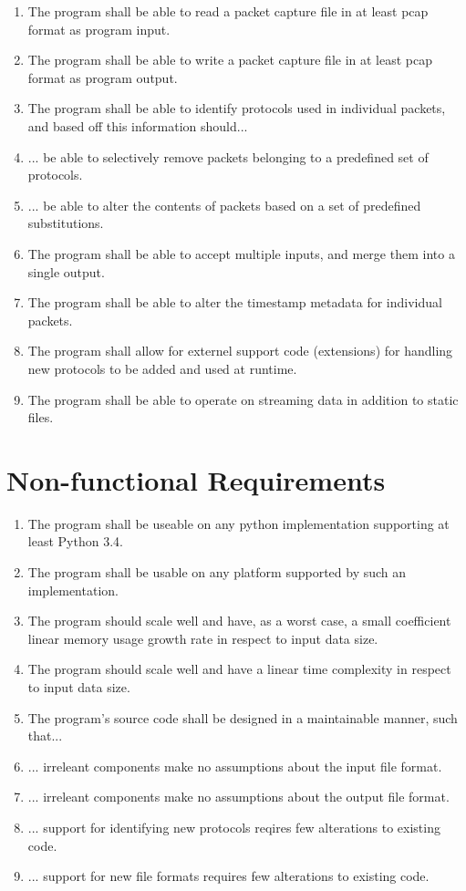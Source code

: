 \documentclass[10pt,a4paper,notitlepage]{report}
\begin{document}
\begin{enumerate}[label=\bfseries FR\arabic*:]
\item \label{fr:1} The program shall be able to read a packet capture file in at least pcap format as program input.
\item \label{fr:2} The program shall be able to write a packet capture file in at least pcap format as program output.
\item \label{fr:3} The program shall be able to identify protocols used in individual packets, and based off this information should...
\item \label{fr:4} ... be able to selectively remove packets belonging to a predefined set of protocols.
\item \label{fr:5} ... be able to alter the contents of packets based on a set of predefined substitutions.
\item \label{fr:6} The program shall be able to accept multiple inputs, and merge them into a single output.
\item \label{fr:7} The program shall be able to alter the timestamp metadata for individual packets.
\item \label{fr:8} The program shall allow for externel support code (extensions) for handling new protocols to be added and used at runtime.
\item \label{fr:9} The program shall be able to operate on streaming data in addition to static files.
\end{enumerate}

\section{Non-functional Requirements}

\begin{enumerate}[label=\bfseries NFR\arabic*:]
\item \label{nfr:1} The program shall be useable on any python implementation supporting at least Python 3.4.
\item \label{nfr:2} The program shall be usable on any platform supported by such an implementation.
\item \label{nfr:3} The program should scale well and have, as a worst case, a small coefficient linear memory usage growth rate in respect to input data size.
\item \label{nfr:4} The program should scale well and have a linear time complexity in respect to input data size.
\item \label{nfr:5} The program's source code shall be designed in a maintainable manner, such that...
\item \label{nfr:6} ... irreleant components make no assumptions about the input file format.
\item \label{nfr:7} ... irreleant components make no assumptions about the output file format.
\item \label{nfr:8} ... support for identifying new protocols reqires few alterations to existing code.
\item \label{nfr:9} ... support for new file formats requires few alterations to existing code.
\end{enumerate}
\end{document}
